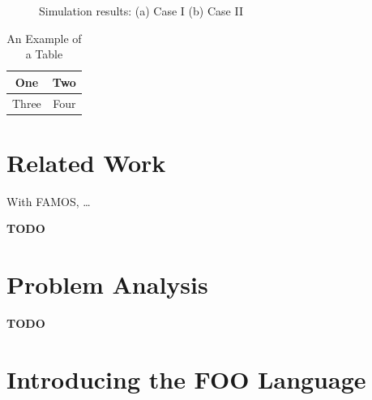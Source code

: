 \documentclass[conference]{IEEEtran}
\newcommand{\TODO}{\textbf{\color{red}TODO}}
\begin{document}
\begin{figure}[H]
\centering
{}
\hfil
{}
\caption{Simulation results: (a) Case I (b) Case II}
\label{fig_sim2}
\end{figure}

\begin{table}[!t]
\renewcommand{\arraystretch}{1.3}
\caption{An Example of a Table}
\label{table_example}
\centering
\begin{tabular}{|c||c|}
\hline
One & Two\\
\hline
Three & Four\\
\hline
\end{tabular}
\end{table}

\section{Related Work}

With FAMOS\cite{maerien2012famos}, \dots

\TODO

\section{Problem Analysis}

\TODO

\section{Introducing the FOO Language}
\end{document}
